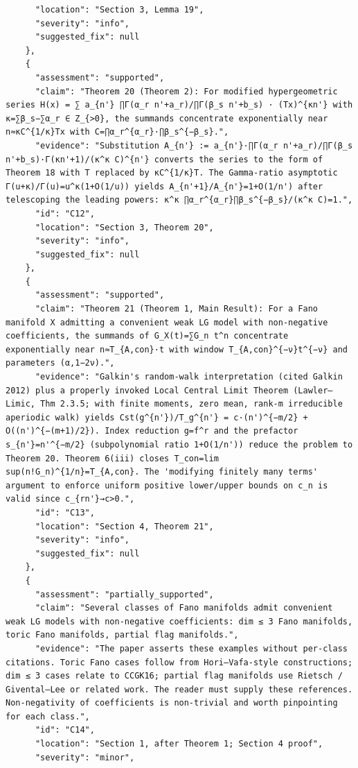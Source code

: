 \documentclass[11pt]{article}
\begin{document}
\begin{verbatim}
      "location": "Section 3, Lemma 19",
      "severity": "info",
      "suggested_fix": null
    },
    {
      "assessment": "supported",
      "claim": "Theorem 20 (Theorem 2): For modified hypergeometric series H(x) = ∑ a_{n'} ∏Γ(α_r n'+a_r)/∏Γ(β_s n'+b_s) · (Tx)^{κn'} with κ=∑β_s−∑α_r ∈ Z_{>0}, the summands concentrate exponentially near n≈κC^{1/κ}Tx with C=∏α_r^{α_r}·∏β_s^{−β_s}.",
      "evidence": "Substitution A_{n'} := a_{n'}·∏Γ(α_r n'+a_r)/∏Γ(β_s n'+b_s)·Γ(κn'+1)/(κ^κ C)^{n'} converts the series to the form of Theorem 18 with T replaced by κC^{1/κ}T. The Gamma-ratio asymptotic Γ(u+κ)/Γ(u)=u^κ(1+O(1/u)) yields A_{n'+1}/A_{n'}=1+O(1/n') after telescoping the leading powers: κ^κ ∏α_r^{α_r}∏β_s^{−β_s}/(κ^κ C)=1.",
      "id": "C12",
      "location": "Section 3, Theorem 20",
      "severity": "info",
      "suggested_fix": null
    },
    {
      "assessment": "supported",
      "claim": "Theorem 21 (Theorem 1, Main Result): For a Fano manifold X admitting a convenient weak LG model with non-negative coefficients, the summands of G_X(t)=∑G_n t^n concentrate exponentially near n≈T_{A,con}·t with window T_{A,con}^{−ν}t^{−ν} and parameters (α,1−2ν).",
      "evidence": "Galkin's random-walk interpretation (cited Galkin 2012) plus a properly invoked Local Central Limit Theorem (Lawler–Limic, Thm 2.3.5; with finite moments, zero mean, rank-m irreducible aperiodic walk) yields Cst(g^{n'})/T_g^{n'} = c·(n')^{−m/2} + O((n')^{−(m+1)/2}). Index reduction g=f^r and the prefactor s_{n'}=n'^{−m/2} (subpolynomial ratio 1+O(1/n')) reduce the problem to Theorem 20. Theorem 6(iii) closes T_con=lim sup(n!G_n)^{1/n}=T_{A,con}. The 'modifying finitely many terms' argument to enforce uniform positive lower/upper bounds on c_n is valid since c_{rn'}→c>0.",
      "id": "C13",
      "location": "Section 4, Theorem 21",
      "severity": "info",
      "suggested_fix": null
    },
    {
      "assessment": "partially_supported",
      "claim": "Several classes of Fano manifolds admit convenient weak LG models with non-negative coefficients: dim ≤ 3 Fano manifolds, toric Fano manifolds, partial flag manifolds.",
      "evidence": "The paper asserts these examples without per-class citations. Toric Fano cases follow from Hori–Vafa-style constructions; dim ≤ 3 cases relate to CCGK16; partial flag manifolds use Rietsch / Givental–Lee or related work. The reader must supply these references. Non-negativity of coefficients is non-trivial and worth pinpointing for each class.",
      "id": "C14",
      "location": "Section 1, after Theorem 1; Section 4 proof",
      "severity": "minor",

\end{verbatim}
\end{document}
